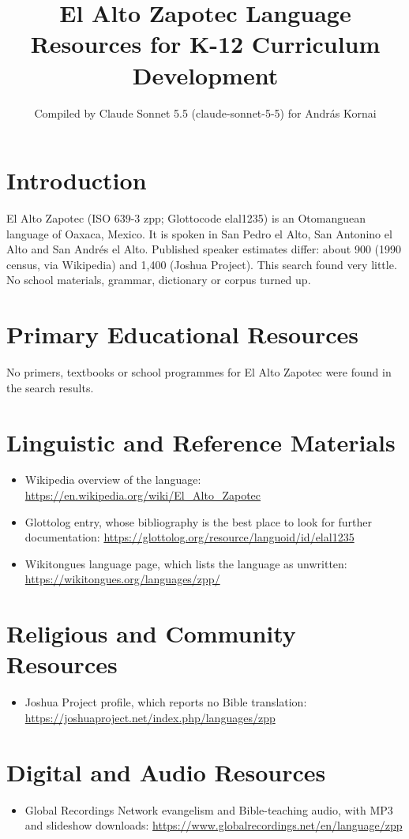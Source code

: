 \documentclass[12pt]{article}
\title{El Alto Zapotec Language Resources for K-12 Curriculum Development}
\author{Compiled by Claude Sonnet 5.5 (claude-sonnet-5-5) for Andr\'as Kornai}
\date{}
\begin{document}
\maketitle

\section{Introduction}
El Alto Zapotec (ISO 639-3 zpp; Glottocode elal1235) is an Otomanguean language of Oaxaca, Mexico. It is spoken in San Pedro el Alto, San Antonino el Alto and San Andr\'es el Alto. Published speaker estimates differ: about 900 (1990 census, via Wikipedia) and 1,400 (Joshua Project). This search found very little. No school materials, grammar, dictionary or corpus turned up.

\section{Primary Educational Resources}
No primers, textbooks or school programmes for El Alto Zapotec were found in the search results.

\section{Linguistic and Reference Materials}
\begin{itemize}
\item Wikipedia overview of the language: \url{https://en.wikipedia.org/wiki/El_Alto_Zapotec}
\item Glottolog entry, whose bibliography is the best place to look for further documentation: \url{https://glottolog.org/resource/languoid/id/elal1235}
\item Wikitongues language page, which lists the language as unwritten: \url{https://wikitongues.org/languages/zpp/}
\end{itemize}

\section{Religious and Community Resources}
\begin{itemize}
\item Joshua Project profile, which reports no Bible translation: \url{https://joshuaproject.net/index.php/languages/zpp}
\end{itemize}

\section{Digital and Audio Resources}
\begin{itemize}
\item Global Recordings Network evangelism and Bible-teaching audio, with MP3 and slideshow downloads: \url{https://www.globalrecordings.net/en/language/zpp}
\end{itemize}
\end{document}
